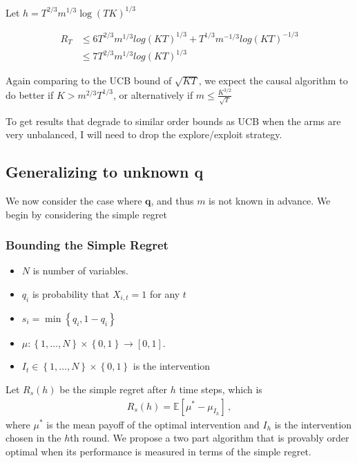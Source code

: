 \documentclass{article}
\newcommand{\E}{\mathbb E}
\newcommand{\set}[1]{\left\{#1\right\}}
\newcommand{\eqn}[1]{\begin{align}#1\end{align}}
\newcommand{\eq}[1]{\begin{align*}#1\end{align*}}
\theoremstyle{plain}
\theoremstyle{definition}
\begin{document}
Let $h = T^{2/3}m^{1/3}\log(TK)^{1/3}$


\eqn {
R_T & \leq 6T^{2/3}m^{1/3}log(KT)^{1/3} + T^{1/3}m^{-1/3}log(KT)^{-1/3}\\ 
& \leq 7T^{2/3}m^{1/3}log(KT)^{1/3}
}
 
Again comparing to the UCB bound of $\sqrt{KT}$, we expect the causal algorithm to do better if $K > m^{2/3}T^{1/3}$, or alternatively if $m \leq \frac{K^{3/2}}{\sqrt{T}}$


To get results that degrade to similar order bounds as UCB when the arms are very unbalanced, I will need to drop the explore/exploit strategy. 


\subsection{Generalizing to unknown q}
We now consider the case where $\boldsymbol{q}$, and thus $m$ is not known in advance. We begin by considering the simple regret 


\subsubsection{Bounding the Simple Regret}

\begin{itemize}
\item $N$ is number of variables.
\item $q_i$ is probability that $X_{i,t} = 1$ for any $t$
\item $s_i = \min\set{q_i, 1 - q_i}$
\item $\mu : \set{1,\ldots,N} \times \set{0,1} \to [0,1]$.
\item $I_t \in \set{1,\ldots,N} \times \set{0,1}$ is the intervention
\end{itemize}

Let $R_s(h)$ be the simple regret after $h$ time steps, which is
\eq{
R_s(h) = \E\left[\mu^* - \mu_{I_h}\right]\,,
}
where $\mu^*$ is the mean payoff of the optimal intervention and $I_h$ is the intervention chosen in the $h$th round.
We propose a two part algorithm that is provably order optimal when its performance is measured in terms of the simple regret.
\end{document}
